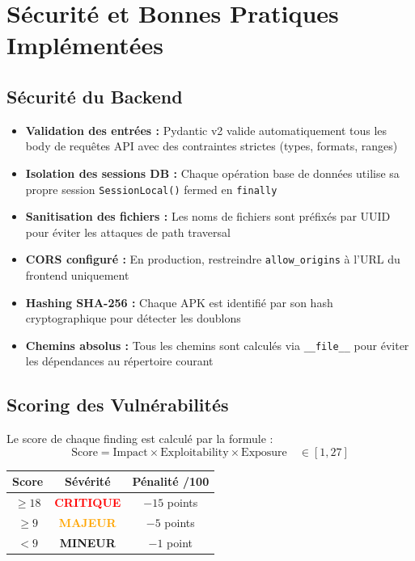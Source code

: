 \documentclass[12pt,a4paper,french]{article}
\newcommand{\critical}[1]{\textcolor{red}{\textbf{#1}}}
\begin{document}
\section{Sécurité et Bonnes Pratiques Implémentées}

\subsection{Sécurité du Backend}

\begin{tcolorbox}[successbox, title={Mesures de Sécurité Implémentées}]
\begin{itemize}[itemsep=4pt]
  \item \textbf{Validation des entrées :} Pydantic v2 valide automatiquement tous les
    body de requêtes API avec des contraintes strictes (types, formats, ranges)
  \item \textbf{Isolation des sessions DB :} Chaque opération base de données utilise
    sa propre session \texttt{SessionLocal()} fermed en \texttt{finally}
  \item \textbf{Sanitisation des fichiers :} Les noms de fichiers sont préfixés par UUID
    pour éviter les attaques de path traversal
  \item \textbf{CORS configuré :} En production, restreindre \texttt{allow\_origins}
    à l'URL du frontend uniquement
  \item \textbf{Hashing SHA-256 :} Chaque APK est identifié par son hash cryptographique
    pour détecter les doublons
  \item \textbf{Chemins absolus :} Tous les chemins sont calculés via \texttt{\_\_file\_\_}
    pour éviter les dépendances au répertoire courant
\end{itemize}
\end{tcolorbox}

\subsection{Scoring des Vulnérabilités}

Le score de chaque finding est calculé par la formule :
$$\text{Score} = \text{Impact} \times \text{Exploitability} \times \text{Exposure} \quad \in [1, 27]$$

\begin{center}
\renewcommand{\arraystretch}{1.3}
\begin{tabular}{ccc}
\toprule
\textbf{Score} & \textbf{Sévérité} & \textbf{Pénalité /100} \\
\midrule
\rowcolor{red!10}
$\geq 18$ & \critical{CRITIQUE} & $-15$ points \\
\rowcolor{orange!10}
$\geq 9$ & \textcolor{orange}{\textbf{MAJEUR}} & $-5$ points \\
$< 9$ & \textcolor{green!70!black}{\textbf{MINEUR}} & $-1$ point \\
\bottomrule
\end{tabular}
\end{center}
\end{document}
